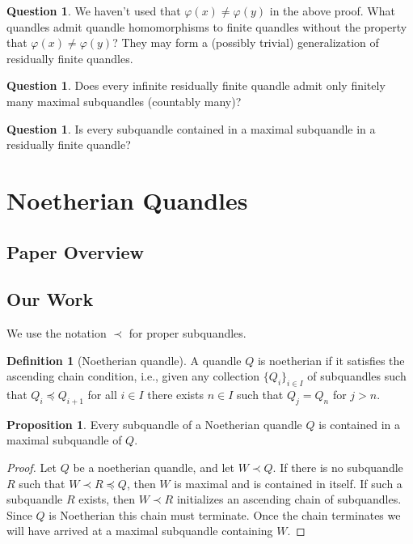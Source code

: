 \documentclass[reqno,dvipsnames]{amsart}
\renewcommand{\phi}{\varphi}
\theoremstyle{definition}
\newtheorem{proposition}[theorem]{Proposition}
\newtheorem{definition}[theorem]{Definition}
\newtheorem{question}[theorem]{Question}
\begin{document}
\begin{question}
We haven't used that $\phi(x)\neq\phi(y)$ in the above proof. What quandles admit quandle homomorphisms to finite quandles without the property that $\phi(x)\neq\phi(y)$? They may form a (possibly trivial) generalization of residually finite quandles.
\end{question}

\begin{question}
Does every infinite residually finite quandle admit only finitely many maximal subquandles (countably many)?
\end{question}

\begin{question}
Is every subquandle contained in a maximal subquandle in a residually finite quandle?
\end{question}

\newpage

\section{Noetherian Quandles}

\subsection{Paper Overview}

\subsection{Our Work}

We use the notation $\prec$ for proper subquandles.

\begin{definition}[Noetherian quandle]
    A quandle $Q$ is noetherian if it satisfies the ascending chain condition, i.e., given any collection $\{Q_i\}_{i\in I}$ of subquandles such that $Q_i\preceq Q_{i+1}$ for all $i\in I$ there exists $n\in I$ such that $Q_j=Q_n$ for $j>n$.
\end{definition}

\begin{proposition}
Every subquandle of a Noetherian quandle $Q$ is contained in a maximal subquandle of $Q$.
\end{proposition}

\begin{proof}
Let $Q$ be a noetherian quandle, and let $W\prec Q$. If there is no subquandle $R$ such that $W\prec R\preceq Q$, then $W$ is maximal and is contained in itself. If such a subquandle $R$ exists, then $W\prec R$ initializes an ascending chain of subquandles. Since $Q$ is Noetherian this chain must terminate. Once the chain terminates we will have arrived at a maximal subquandle containing $W$.
\end{proof}
\end{document}
